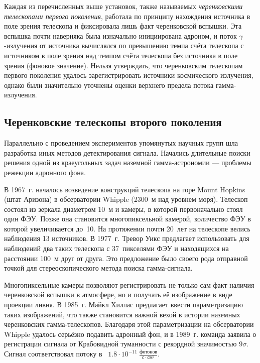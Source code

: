 \documentclass[magd,floatypics,numeref]{msudipl} %
\begin{document}
Каждая из перечисленных выше установок, также называемых \textit{черенковскими телескопами первого поколения}, работала по принципу нахождения источника в поле зрения телескопа и фиксировала лишь факт черенковской вспышки. Эта вспышка почти наверняка была изначально инициирована адроном, и поток $\gamma$-излучения от источника вычислялся по превышению темпа счёта телескопа с источником в поле зрения над темпом счёта телескопа без источника в поле зрения (фоновое значение).  Нельзя утверждать, что черенковским телескопам первого поколения удалось зарегистрировать источники космического излучения, однако были значительно уточнены оценки верхнего предела потока гамма-излучения.
\subsection{Черенковские телескопы второго поколения}
Параллельно с проведением экспериментов упомянутых научных групп шла разработка иных методов детектирования сигнала. Начались длительные поиски решения одной из краеугольных задач наземной гамма-астрономии --- проблемы режекции адронного фона. 

В 1967~г. началось возведение конструкций телескопа на горе Mount Hopkins (штат Аризона) в обсерватории Whipple (2300~м над уровнем моря). Телескоп состоял из зеркала диаметром 10~м и камеры, в которой первоначально стоял один ФЭУ. Позже она становится многопиксельной камерой, количество ФЭУ в которой увеличивается до~10. На протяжении почти 20~лет на телескопе велись наблюдения 13 источников. В 1977~г. Тревор Уикс предлагает использовать для наблюдений два таких телескопа с 37~пикселями ФЭУ и находящихся на расстоянии 100~м друг от друга. Это предложение было своего рода отправной точкой для стереоскопического метода поиска гамма-сигнала. 

Многопиксельные камеры позволяют регистрировать не только сам факт наличия черенковской вспышки в атмосфере, но и получать её изображение в виде проекции ливня. В 1985~г. Майкл Хиллас предлагает ввести параметризацию таких изображений, что также становится важной вехой в истории наземных черенковских гамма-телескопов. Благодаря этой параметризации на обсерватории Whipple удалось серьёзно подавить адронный фон, и в 1989~г. команда заявила о регистрации сигнала от Крабовидной туманности с рекордной значимостью $9\sigma$. Сигнал соответствовал потоку в~ $1.8\cdot10^{-11}~\frac{\text{фотонов}}{\text{с}\cdot\text{см}^2}$. 
\end{document}
